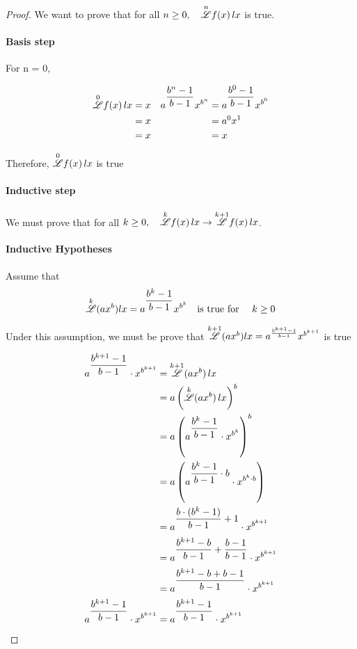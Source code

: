 \documentclass[12pt, letterpaper]{article}
\begin{document}
\begin{proof}
    We want to prove that for all $n \ge 0, \quad \overset{n}{\mathscr{L}} f(x) \, lx$  is true.

    \paragraph{Basis step}
    For n = 0, 
    
    \begin{align*}
        \iterator {0} f(x) \, lx &= x &
        a^{\displaystyle \frac{b^{n}-1}{b-1}}x^{b^{n}} &=
        a^{\displaystyle \frac{b^0-1}{b-1}}x^{b^0} \\
%
        &= x &&= a^0 x^{1} \\
        &= x &&= x \\
    \end{align*}
        
    Therefore, $\overset{0}{\mathscr{L}} f(x) \, lx$ is true

    \paragraph{Inductive step}

    We must prove that for all $k \ge 0, \quad \overset{k}{\mathscr{L}} f(x) \, lx \to \overset{k+1}{\mathscr{L}} f(x) \, lx$.

    \paragraph{Inductive Hypotheses}
    Assume that 
    \begin{equation*}
        \overset{k}{\mathscr{L}} (ax^b) lx = a^{\displaystyle \frac{b^{k}-1}{b-1}}x^{b^{k}} 
        \quad \text{is true for } \quad k \ge 0
    \end{equation*}
    
    Under this assumption, we must be prove that 
    $\overset{k+1}{\mathscr{L}} (ax^b) lx = a^{\frac{b^{k+1}-1}{b-1}}x^{b^{k+1}}$
    is true

    \begin{align*}
        a^{\displaystyle \frac{b^{k+1}-1}{b-1}} \cdot x^{b^{k+1}} &= 
        \iterator {k+1} (ax^b) \,lx \\
%
        &=  a\left(\iterator {k} (ax^b) \,lx\right)^b \\
        &= a\left( a^{\displaystyle \frac{b^k-1}{b-1}}  \cdot x^{b^k} \right)^b \\
        &= a\left( a^{\displaystyle {\frac{b^k-1}{b-1}}\cdot b}  \cdot x^{b^k \cdot b} \right) \\
        &= a^{\displaystyle {\frac{b\cdot (b^k-1)}{b-1}} + 1}  \cdot x^{b^{k+1}}  \\
        &= a^{\displaystyle {\frac{b^{k+1}-b}{b-1}} + \frac{b-1}{b-1}} \cdot x^{b^{k+1}}  \\
        &= a^{\displaystyle {\frac{b^{k+1}-b + b - 1}{b-1}} }  \cdot x^{b^{k+1}}  \\
%
        a^{\displaystyle \frac{b^{k+1}-1}{b-1} }  \cdot x^{b^{k+1}} &=
        a^{\displaystyle \frac{b^{k+1}-1}{b-1} }  \cdot x^{b^{k+1}}  \\
    \end{align*}


\end{proof}
\end{document}

